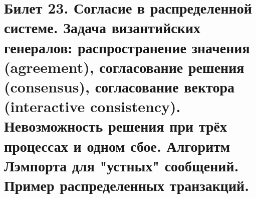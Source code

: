 \newpage
\section{Билет 23. Согласие в распределенной системе. Задача византийских генералов: распространение значения (agreement), согласование решения (consensus), согласование вектора (interactive consistency). Невозможность решения при трёх процессах и одном сбое. Алгоритм Лэмпорта для "устных" сообщений. Пример распределенных транзакций.}
